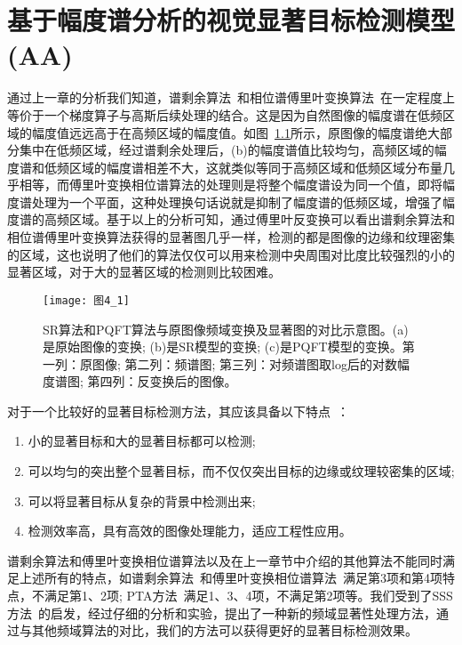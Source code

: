 
\chapter{基于幅度谱分析的视觉显著目标检测模型(AA)}
\label{cha4}

通过上一章的分析我们知道，谱剩余算法~\cite{HouXiaodiCVPR2007Residual}和相位谱傅里叶变换算法~\cite{GuoChenleiCVPR2008Spatio}在一定程度上等价于一个梯度算子与高斯后续处理的结合。这是因为自然图像的幅度谱在低频区域的幅度值远远高于在高频区域的幅度值。如图~\ref{图4_1}所示，原图像的幅度谱绝大部分集中在低频区域，经过谱剩余处理后，(b)的幅度谱值比较均匀，高频区域的幅度谱和低频区域的幅度谱相差不大，这就类似等同于高频区域和低频区域分布量几乎相等，而傅里叶变换相位谱算法的处理则是将整个幅度谱设为同一个值，即将幅度谱处理为一个平面，这种处理换句话说就是抑制了幅度谱的低频区域，增强了幅度谱的高频区域。基于以上的分析可知，通过傅里叶反变换可以看出谱剩余算法和相位谱傅里叶变换算法获得的显著图几乎一样，检测的都是图像的边缘和纹理密集的区域，这也说明了他们的算法仅仅可以用来检测中央周围对比度比较强烈的小的显著区域，对于大的显著区域的检测则比较困难。
\begin{figure}[h]
  \centering
  \texttt{[image: 图4\_1]}
  \caption{SR算法和PQFT算法与原图像频域变换及显著图的对比示意图。(a)是原始图像的变换; (b)是SR模型的变换; (c)是PQFT模型的变换。第一列：原图像; 第二列：频谱图; 第三列：对频谱图取log后的对数幅度谱图; 第四列：反变换后的图像。}
  \label{图4_1}    
\end{figure}

对于一个比较好的显著目标检测方法，其应该具备以下特点~\cite{AchantaCVPR2009Frequency}：
\begin{enumerate}
\item 小的显著目标和大的显著目标都可以检测;
\item 可以均匀的突出整个显著目标，而不仅仅突出目标的边缘或纹理较密集的区域;
\item 可以将显著目标从复杂的背景中检测出来;
\item 检测效率高，具有高效的图像处理能力，适应工程性应用。
\end{enumerate}

谱剩余算法和傅里叶变换相位谱算法以及在上一章节中介绍的其他算法不能同时满足上述所有的特点，如谱剩余算法~\cite{HouXiaodiCVPR2007Residual}和傅里叶变换相位谱算法~\cite{GuoChenleiCVPR2008Spatio}满足第3项和第4项特点，不满足第1、2项; PTA方法~\cite{李崇飞2012相位谱}满足1、3、4项，不满足第2项等。我们受到了SSS方法~\cite{LiJianTPAMI2013Scale}的启发，经过仔细的分析和实验，提出了一种新的频域显著性处理方法，通过与其他频域算法的对比，我们的方法可以获得更好的显著目标检测效果。

